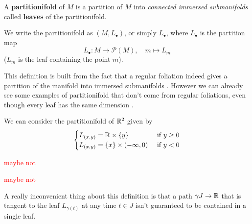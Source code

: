 	\begin{definition}
		A \textbf{partitionifold} of $M$ is a partition of $M$ into \emph{connected immersed submanifolds} called \textbf{leaves} of the partitionifold.

		We write the partitionifold as $(M, L_\bullet)$, or simply $L_\bullet$, where $L_\bullet$ is the partition map
		$$
			L_\bullet : M \to \mathcal{P}(M), \quad m \mapsto L_m
		$$
		($L_m$ is the leaf containing the point $m$).

	\end{definition}

	This definition is built from the fact that a regular foliation indeed gives a partition of the manifold into immersed submanifolds . However we can already see some examples of partitionifold that don't come from regular foliations, even though every leaf has the same dimension .

	\begin{example}[``T'' partitionifold]
		We can consider the partitionifold of $\mathbb{R}^2$ given by
		$$
		\begin{cases}
			L_{(x,y)} = \mathbb{R} \times \{y\}            &\text{ if } y \geq 0 \\
			L_{(x,y)} = \{x\} \times (-\infty, 0)  &\text{ if } y < 0
		\end{cases}
		$$

	\end{example}

	\begin{example}
		\textcolor{Red}{maybe not}
	\end{example}

	\begin{example}
		\textcolor{Red}{maybe not}
	\end{example}


	A really inconvenient thing about this definition is that a path $\gamma J \to \mathbb{R}$ that is tangent to the leaf $L_{\gamma(t)}$ at any time $t \in J$ isn't guaranteed to be contained in a single leaf.

